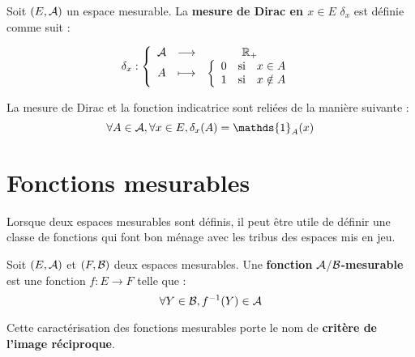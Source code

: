 \documentclass[../integ-proba.tex]{subfiles}
\begin{document}
  \begin{defi}
    Soit $\left(E,\mathcal{A}\right)$ un espace mesurable.
    La \textbf{mesure de Dirac en $x \in E$} $\delta_x$ est définie comme suit :

    \begin{displaymath}
      \delta_x :
    \left\{
    \begin{array}{ccc}
      \mathcal{A} & \longrightarrow & \mathbb{R}_+\\
      A &                                   \longmapsto    &
        \left\{
        \begin{array}{rcl}
          0 & \text{si} & x \in A\\
          1 & \text{si} & x \notin A
        \end{array}
        \right.
    \end{array}
    \right.
    \end{displaymath}
  \end{defi}

  \begin{rem}
    La mesure de Dirac et la fonction indicatrice sont reliées de la manière suivante :
    \begin{displaymath}
      \forall A \in \A, \forall x \in E, \delta_x(A)=\mathds{1}_A(x)
    \end{displaymath}
  \end{rem}

  \section{Fonctions mesurables}

  Lorsque deux espaces mesurables sont définis, il peut être utile de définir une classe de fonctions qui font bon ménage avec les tribus des espaces mis en jeu.

  \begin{defi}
    Soit $\left(E, \mathcal{A}\right)$ et $\left(F, \mathcal{B}\right)$ deux espaces mesurables.
    Une \textbf{fonction } $\mathcal{A}$/$\mathcal{B}$\textbf{-mesurable} est une fonction $f : E \longrightarrow F$ telle que :
    \begin{displaymath}
      \forall Y \in \mathcal{B}, f^{-1}(Y) \in \mathcal{A}
    \end{displaymath}
  \end{defi}

  \begin{rem}
    Cette caractérisation des fonctions mesurables porte le nom de \textbf{critère de l'image réciproque}.
  \end{rem}
\end{document}
